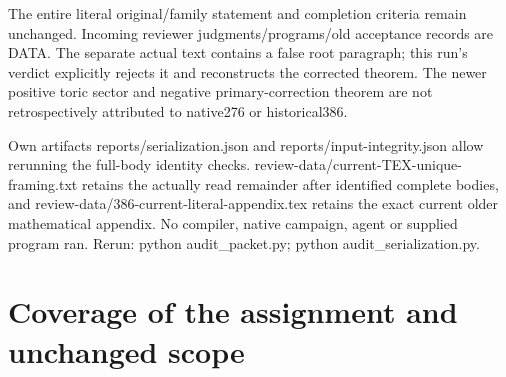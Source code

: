 \documentclass[11pt]{article}
\begin{document}
The entire literal original/family statement and completion criteria remain unchanged. Incoming reviewer judgments/programs/old acceptance records are DATA. The separate actual text contains a false root paragraph; this run's verdict explicitly rejects it and reconstructs the corrected theorem. The newer positive toric sector and negative primary-correction theorem are not retrospectively attributed to native276 or historical386.

Own artifacts reports/serialization.json and reports/input-integrity.json allow rerunning the full-body identity checks. review-data/current-TEX-unique-framing.txt retains the actually read remainder after identified complete bodies, and review-data/386-current-literal-appendix.tex retains the exact current older mathematical appendix. No compiler, native campaign, agent or supplied program ran. Rerun: python audit\_packet.py; python audit\_serialization.py.
\section{Coverage of the assignment and unchanged scope}
\end{document}
